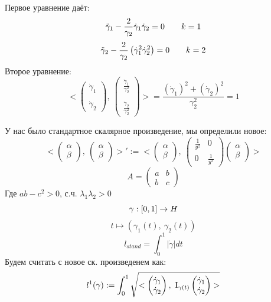 \documentclass[main]{subfiles}
\begin{document}
    \begin{sol}
        Первое уравнение даёт:
        \[\ddot{\gamma}_1 - \frac{2}{\gamma_2} \dot{\gamma}_1 \dot{\gamma}_2 = 0 \qquad k=1\]
        \[\ddot{\gamma}_2 - \frac{2}{\gamma_2} \left(\dot{\gamma}_1^2 \dot{\gamma}_2^2\right) = 0 \qquad k=2\]
        Второе уравнение:
        \[<\begin{pmatrix}
            \dot{\gamma}_1\\ \\
            \dot{\gamma}_2
        \end{pmatrix},\ \begin{pmatrix}
            \frac{\dot{\gamma}_1}{\gamma_2^2}\\ \\
            \frac{\dot{\gamma}_2}{\gamma_2^2}
        \end{pmatrix}> = \frac{(\dot{\gamma}_1)^2 + (\dot{\gamma}_2)^2}{\gamma_2^2} = 1\]
    \end{sol}

    \begin{definition}
      У нас было стандартное скалярное произведение, мы определили новое:
      \[<\begin{pmatrix}
        \alpha\\
        \beta
      \end{pmatrix},\ \begin{pmatrix}
        \alpha\\
        \beta
      \end{pmatrix}>' := <\begin{pmatrix}
        \alpha\\
        \beta
      \end{pmatrix},\ \begin{pmatrix}
        \frac{1}{y^2} & 0\\
        0 & \frac{1}{y^2}
      \end{pmatrix}\begin{pmatrix}
        \alpha\\
        \beta
      \end{pmatrix}>\]
      \[A = \begin{pmatrix}
        a & b\\
        b & c
      \end{pmatrix}\]
      Где $ab - c^2 > 0$, с.ч. $\lambda_1 \lambda_2 > 0$
      \[\gamma: [0,1] \rightarrow H\]
      \[t \mapsto (\gamma_1(t),\ \gamma_2(t))\]
      \[l_{stand} = \int_0^1  |\dot{\gamma}| dt\]
      Будем считать с новое ск. произведенем как:
      \[l^1 (\gamma) := \int_0^1 \sqrt{<\begin{pmatrix}
        \dot{\gamma}_1\\
        \dot{\gamma}_2
      \end{pmatrix},\ \RNumb{1}_{\gamma(t)} \begin{pmatrix}
        \dot{\gamma}_1\\
        \dot{\gamma}_2
      \end{pmatrix}>}\]
    \end{definition}
\end{document}
